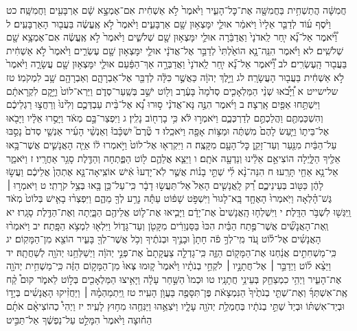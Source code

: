 \documentclass[twoside, openany, parskip=half, 11pt]{book}
\begin{document}
חֲמִשָּׁ֔ה הֲתַשְׁחִ֥ית בַּחֲמִשָּׁ֖ה אֶת־כׇּל־הָעִ֑יר וַיֹּ֙אמֶר֙ לֹ֣א אַשְׁחִ֔ית אִם־אֶמְצָ֣א שָׁ֔ם אַרְבָּעִ֖ים וַחֲמִשָּֽׁה׃ כט וַיֹּ֨סֶף ע֜וֹד לְדַבֵּ֤ר אֵלָיו֙ וַיֹּאמַ֔ר אוּלַ֛י יִמָּצְא֥וּן שָׁ֖ם אַרְבָּעִ֑ים וַיֹּ֙אמֶר֙ לֹ֣א אֶֽעֱשֶׂ֔ה בַּעֲב֖וּר הָאַרְבָּעִֽים׃ ל וַ֠יֹּ֠אמֶר אַל־נָ֞א יִ֤חַר לַֽאדֹנָי֙ וַאֲדַבֵּ֔רָה אוּלַ֛י יִמָּצְא֥וּן שָׁ֖ם שְׁלֹשִׁ֑ים וַיֹּ֙אמֶר֙ לֹ֣א אֶֽעֱשֶׂ֔ה אִם־אֶמְצָ֥א שָׁ֖ם שְׁלֹשִֽׁים׃ לא וַיֹּ֗אמֶר הִנֵּֽה־נָ֤א הוֹאַ֙לְתִּי֙ לְדַבֵּ֣ר אֶל־אֲדֹנָ֔י אוּלַ֛י יִמָּצְא֥וּן שָׁ֖ם עֶשְׂרִ֑ים וַיֹּ֙אמֶר֙ לֹ֣א אַשְׁחִ֔ית בַּעֲב֖וּר הָֽעֶשְׂרִֽים׃ לב וַ֠יֹּ֠אמֶר אַל־נָ֞א יִ֤חַר לַֽאדֹנָי֙ וַאֲדַבְּרָ֣ה אַךְ־הַפַּ֔עַם אוּלַ֛י יִמָּצְא֥וּן שָׁ֖ם עֲשָׂרָ֑ה וַיֹּ֙אמֶר֙ לֹ֣א אַשְׁחִ֔ית בַּעֲב֖וּר הָעֲשָׂרָֽה׃ לג וַיֵּ֣לֶךְ יְהֹוָ֔ה כַּאֲשֶׁ֣ר כִּלָּ֔ה לְדַבֵּ֖ר אֶל־אַבְרָהָ֑ם וְאַבְרָהָ֖ם שָׁ֥ב לִמְקֹמֽוֹ׃ טז שלישייט א וַ֠יָּבֹ֠אוּ שְׁנֵ֨י הַמַּלְאָכִ֤ים סְדֹ֙מָה֙ בָּעֶ֔רֶב וְל֖וֹט יֹשֵׁ֣ב בְּשַֽׁעַר־סְדֹ֑ם וַיַּרְא־לוֹט֙ וַיָּ֣קׇם לִקְרָאתָ֔ם וַיִּשְׁתַּ֥חוּ אַפַּ֖יִם אָֽרְצָה׃ ב וַיֹּ֜אמֶר הִנֶּ֣ה נָּא־אֲדֹנַ֗י ס֣וּרוּ נָ֠א אֶל־בֵּ֨ית עַבְדְּכֶ֤ם וְלִ֙ינוּ֙ וְרַחֲצ֣וּ רַגְלֵיכֶ֔ם וְהִשְׁכַּמְתֶּ֖ם וַהֲלַכְתֶּ֣ם לְדַרְכְּכֶ֑ם וַיֹּאמְר֣וּ לֹּ֔א כִּ֥י בָרְח֖וֹב נָלִֽין׃ ג וַיִּפְצַר־בָּ֣ם מְאֹ֔ד וַיָּסֻ֣רוּ אֵלָ֔יו וַיָּבֹ֖אוּ אֶל־בֵּית֑וֹ וַיַּ֤עַשׂ לָהֶם֙ מִשְׁתֶּ֔ה וּמַצּ֥וֹת אָפָ֖ה וַיֹּאכֵֽלוּ׃ ד טֶ֘רֶם֮ יִשְׁכָּ֒בוּ֒ וְאַנְשֵׁ֨י הָעִ֜יר אַנְשֵׁ֤י סְדֹם֙ נָסַ֣בּוּ עַל־הַבַּ֔יִת מִנַּ֖עַר וְעַד־זָקֵ֑ן כׇּל־הָעָ֖ם מִקָּצֶֽה׃ ה וַיִּקְרְא֤וּ אֶל־לוֹט֙ וַיֹּ֣אמְרוּ ל֔וֹ אַיֵּ֧ה הָאֲנָשִׁ֛ים אֲשֶׁר־בָּ֥אוּ אֵלֶ֖יךָ הַלָּ֑יְלָה הוֹצִיאֵ֣ם אֵלֵ֔ינוּ וְנֵדְעָ֖ה אֹתָֽם׃ ו וַיֵּצֵ֧א אֲלֵהֶ֛ם ל֖וֹט הַפֶּ֑תְחָה וְהַדֶּ֖לֶת סָגַ֥ר אַחֲרָֽיו׃ ז וַיֹּאמַ֑ר אַל־נָ֥א אַחַ֖י תָּרֵֽעוּ׃ ח הִנֵּה־נָ֨א לִ֜י שְׁתֵּ֣י בָנ֗וֹת אֲשֶׁ֤ר לֹֽא־יָדְעוּ֙ אִ֔ישׁ אוֹצִֽיאָה־נָּ֤א אֶתְהֶן֙ אֲלֵיכֶ֔ם וַעֲשׂ֣וּ לָהֶ֔ן כַּטּ֖וֹב בְּעֵינֵיכֶ֑ם רַ֠ק לָֽאֲנָשִׁ֤ים הָאֵל֙ אַל־תַּעֲשׂ֣וּ דָבָ֔ר כִּֽי־עַל־כֵּ֥ן בָּ֖אוּ בְּצֵ֥ל קֹרָתִֽי׃ ט וַיֹּאמְר֣וּ ׀ גֶּשׁ־הָ֗לְאָה וַיֹּֽאמְרוּ֙ הָאֶחָ֤ד בָּֽא־לָגוּר֙ וַיִּשְׁפֹּ֣ט שָׁפ֔וֹט עַתָּ֕ה נָרַ֥ע לְךָ֖ מֵהֶ֑ם וַיִּפְצְר֨וּ בָאִ֤ישׁ בְּלוֹט֙ מְאֹ֔ד וַֽיִּגְּשׁ֖וּ לִשְׁבֹּ֥ר הַדָּֽלֶת׃ י וַיִּשְׁלְח֤וּ הָֽאֲנָשִׁים֙ אֶת־יָדָ֔ם וַיָּבִ֧יאוּ אֶת־ל֛וֹט אֲלֵיהֶ֖ם הַבָּ֑יְתָה וְאֶת־הַדֶּ֖לֶת סָגָֽרוּ׃ יא וְֽאֶת־הָאֲנָשִׁ֞ים אֲשֶׁר־פֶּ֣תַח הַבַּ֗יִת הִכּוּ֙ בַּסַּנְוֵרִ֔ים מִקָּטֹ֖ן וְעַד־גָּד֑וֹל וַיִּלְא֖וּ לִמְצֹ֥א הַפָּֽתַח׃ יב וַיֹּאמְר֨וּ הָאֲנָשִׁ֜ים אֶל־ל֗וֹט עֹ֚ד מִֽי־לְךָ֣ פֹ֔ה חָתָן֙ וּבָנֶ֣יךָ וּבְנֹתֶ֔יךָ וְכֹ֥ל אֲשֶׁר־לְךָ֖ בָּעִ֑יר הוֹצֵ֖א מִן־הַמָּקֽוֹם׃ יג כִּֽי־מַשְׁחִתִ֣ים אֲנַ֔חְנוּ אֶת־הַמָּק֖וֹם הַזֶּ֑ה כִּֽי־גָדְלָ֤ה צַעֲקָתָם֙ אֶת־פְּנֵ֣י יְהֹוָ֔ה וַיְשַׁלְּחֵ֥נוּ יְהֹוָ֖ה לְשַׁחֲתָֽהּ׃ יד וַיֵּצֵ֨א ל֜וֹט וַיְדַבֵּ֣ר ׀ אֶל־חֲתָנָ֣יו ׀ לֹקְחֵ֣י בְנֹתָ֗יו וַיֹּ֙אמֶר֙ ק֤וּמוּ צְּאוּ֙ מִן־הַמָּק֣וֹם הַזֶּ֔ה כִּֽי־מַשְׁחִ֥ית יְהֹוָ֖ה אֶת־הָעִ֑יר וַיְהִ֥י כִמְצַחֵ֖ק בְּעֵינֵ֥י חֲתָנָֽיו׃ טו וּכְמוֹ֙ הַשַּׁ֣חַר עָלָ֔ה וַיָּאִ֥יצוּ הַמַּלְאָכִ֖ים בְּל֣וֹט לֵאמֹ֑ר קוּם֩ קַ֨ח אֶֽת־אִשְׁתְּךָ֜ וְאֶת־שְׁתֵּ֤י בְנֹתֶ֙יךָ֙ הַנִּמְצָאֹ֔ת פֶּן־תִּסָּפֶ֖ה בַּעֲוֺ֥ן הָעִֽיר׃ טז וַֽיִּתְמַהְמָ֓הּ ׀ וַיַּחֲזִ֨יקוּ הָאֲנָשִׁ֜ים בְּיָד֣וֹ וּבְיַד־אִשְׁתּ֗וֹ וּבְיַד֙ שְׁתֵּ֣י בְנֹתָ֔יו בְּחֶמְלַ֥ת יְהֹוָ֖ה עָלָ֑יו וַיֹּצִאֻ֥הוּ וַיַּנִּחֻ֖הוּ מִח֥וּץ לָעִֽיר׃ יז וַיְהִי֩ כְהוֹצִיאָ֨ם אֹתָ֜ם הַח֗וּצָה וַיֹּ֙אמֶר֙ הִמָּלֵ֣ט עַל־נַפְשֶׁ֔ךָ אַל־תַּבִּ֣יט 
\end{document}
